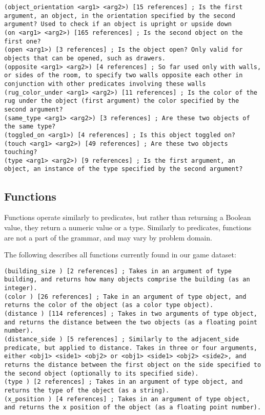 \documentclass{article}
\begin{document}
\begin{lstlisting}
(object_orientation <arg1> <arg2>) [15 references] ; Is the first argument, an object, in the orientation specified by the second argument? Used to check if an object is upright or upside down
(on <arg1> <arg2>) [165 references] ; Is the second object on the first one?
(open <arg1>) [3 references] ; Is the object open? Only valid for objects that can be opened, such as drawers.
(opposite <arg1> <arg2>) [4 references] ; So far used only with walls, or sides of the room, to specify two walls opposite each other in conjunction with other predicates involving these walls
(rug_color_under <arg1> <arg2>) [11 references] ; Is the color of the rug under the object (first argument) the color specified by the second argument?
(same_type <arg1> <arg2>) [3 references] ; Are these two objects of the same type?
(toggled_on <arg1>) [4 references] ; Is this object toggled on?
(touch <arg1> <arg2>) [49 references] ; Are these two objects touching?
(type <arg1> <arg2>) [9 references] ; Is the first argument, an object, an instance of the type specified by the second argument?
\end{lstlisting}



\subsection{Functions} \label{sec:functions}
Functions operate similarly to predicates, but rather than returning a Boolean value, they return a numeric value or a type.
Similarly to predicates, functions are not a part of the grammar, and may vary by problem domain.

The following describes all functions currently found in our game dataset:
\begin{lstlisting}
(building_size ) [2 references] ; Takes in an argument of type building, and returns how many objects comprise the building (as an integer).
(color ) [26 references] ; Take in an argument of type object, and returns the color of the object (as a color type object).
(distance ) [114 references] ; Takes in two arguments of type object, and returns the distance between the two objects (as a floating point number).
(distance_side ) [5 references] ; Similarly to the adjacent_side predicate, but applied to distance. Takes in three or four arguments, either <obj1> <side1> <obj2> or <obj1> <side1> <obj2> <side2>, and returns the distance between the first object on the side specified to the second object (optionally to its specified side).
(type ) [2 references] ; Takes in an argument of type object, and returns the type of the object (as a string).
(x_position ) [4 references] ; Takes in an argument of type object, and returns the x position of the object (as a floating point number).
\end{lstlisting}
\end{document}
